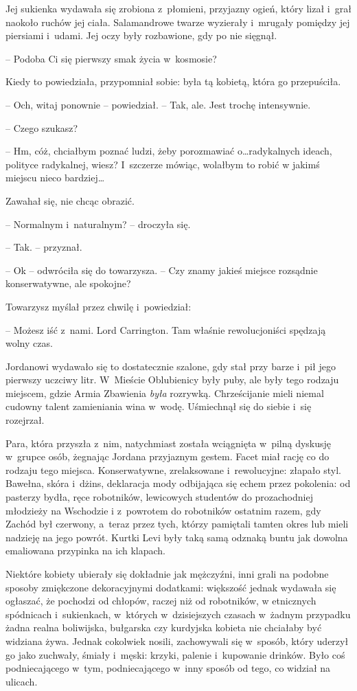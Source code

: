 \documentclass[oneside,polish,11pt,sfheadings]{mwbk}
\begin{document}
Jej sukienka wydawała się zrobiona z~płomieni, przyjazny ogień, który
lizał i~grał naokoło ruchów jej ciała. Salamandrowe twarze wyzierały i~mrugały pomiędzy jej piersiami i~udami. Jej oczy były rozbawione, gdy po
nie sięgnął.

-- Podoba Ci się pierwszy smak życia w~kosmosie?

Kiedy to powiedziała, przypomniał sobie: była tą kobietą, która go
przepuściła.

-- Och, witaj ponownie -- powiedział. -- Tak, ale. Jest trochę intensywnie.

-- Czego szukasz?

-- Hm, cóż, chciałbym poznać ludzi, żeby porozmawiać o\ldots radykalnych
ideach, polityce radykalnej, wiesz? I~szczerze mówiąc, wolałbym to robić
w jakimś miejscu nieco bardziej\ldots

Zawahał się, nie chcąc obrazić.

-- Normalnym i~naturalnym? -- droczyła się.

-- Tak. -- przyznał.

-- Ok -- odwróciła się do towarzysza. -- Czy znamy jakieś miejsce rozsądnie
konserwatywne, ale spokojne?

Towarzysz myślał przez chwilę i~powiedział: 

-- Możesz iść z~nami. Lord
Carrington. Tam właśnie rewolucjoniści spędzają wolny czas. 

Jordanowi
wydawało się to dostatecznie szalone, gdy stał przy barze i~pił jego
pierwszy uczciwy litr. W~Mieście Oblubienicy były puby, ale były tego
rodzaju miejscem, gdzie Armia Zbawienia \emph{była} rozrywką.
Chrześcijanie mieli niemal cudowny talent zamieniania wina w~wodę.
Uśmiechnął się do siebie i~się rozejrzał.

Para, która przyszła z~nim, natychmiast została wciągnięta w~pilną
dyskusję w~grupce osób, żegnając Jordana przyjaznym gestem. Facet miał
rację co do rodzaju tego miejsca. Konserwatywne, zrelaksowane i~rewolucyjne: złapało styl. Bawełna, skóra i~dżins, deklaracja mody
odbijająca się echem przez pokolenia: od pasterzy bydła, ręce
robotników, lewicowych studentów do prozachodniej młodzieży na Wschodzie
i z~powrotem do robotników ostatnim razem, gdy Zachód był czerwony, a~teraz przez tych, którzy pamiętali tamten okres lub mieli nadzieję na
jego powrót. Kurtki Levi były taką samą odznaką buntu jak dowolna
emaliowana przypinka na ich klapach.

Niektóre kobiety ubierały się dokładnie jak mężczyźni, inni grali na
podobne sposoby zmiękczone dekoracyjnymi dodatkami: większość jednak
wydawała się ogłaszać, że pochodzi od chłopów, raczej niż od robotników,
w etnicznych spódnicach i~sukienkach, w~których w~dzisiejszych czasach w~żadnym przypadku żadna realna boliwijska, bułgarska czy kurdyjska
kobieta nie chciałaby być widziana żywa. Jednak cokolwiek nosili,
zachowywali się w~sposób, który uderzył go jako zuchwały, śmiały i~męski: krzyki, palenie i~kupowanie drinków. Było coś podniecającego w~tym, podniecającego w~inny sposób od tego, co widział na ulicach.
\end{document}
